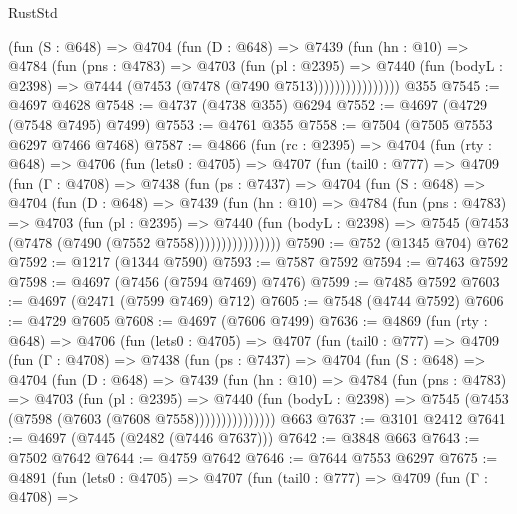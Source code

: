 \begin{lexlean}{RustStd}
\begin{coremodule}
                  (fun (S : @648) =>
                  @4704
                    (fun (D : @648) =>
                    @7439
                      (fun (hn : @10) =>
                      @4784
                        (fun (pns : @4783) =>
                        @4703
                          (fun (pl : @2395) =>
                          @7440
                            (fun (bodyL : @2398) => @7444 (@7453 (@7478 (@7490 @7513))))))))))))))))
    @355
@7545 := @4697 @4628
@7548 := @4737 (@4738 @355) @6294
@7552 := @4697 (@4729 (@7548 @7495) @7499)
@7553 := @4761 @355
@7558 := @7504 (@7505 @7553 @6297 @7466 @7468)
@7587 := @4866
    (fun (rc : @2395) =>
    @4704
      (fun (rty : @648) =>
      @4706
        (fun (lets0 : @4705) =>
        @4707
          (fun (tail0 : @777) =>
          @4709
            (fun (Γ : @4708) =>
            @7438
              (fun (ps : @7437) =>
              @4704
                (fun (S : @648) =>
                @4704
                  (fun (D : @648) =>
                  @7439
                    (fun (hn : @10) =>
                    @4784
                      (fun (pns : @4783) =>
                      @4703
                        (fun (pl : @2395) =>
                        @7440
                          (fun (bodyL : @2398) =>
                          @7545 (@7453 (@7478 (@7490 (@7552 @7558))))))))))))))))
@7590 := @752 (@1345 @704) @762
@7592 := @1217 (@1344 @7590)
@7593 := @7587 @7592
@7594 := @7463 @7592
@7598 := @4697 (@7456 (@7594 @7469) @7476)
@7599 := @7485 @7592
@7603 := @4697 (@2471 (@7599 @7469) @712)
@7605 := @7548 (@4744 @7592)
@7606 := @4729 @7605
@7608 := @4697 (@7606 @7499)
@7636 := @4869
    (fun (rty : @648) =>
    @4706
      (fun (lets0 : @4705) =>
      @4707
        (fun (tail0 : @777) =>
        @4709
          (fun (Γ : @4708) =>
          @7438
            (fun (ps : @7437) =>
            @4704
              (fun (S : @648) =>
              @4704
                (fun (D : @648) =>
                @7439
                  (fun (hn : @10) =>
                  @4784
                    (fun (pns : @4783) =>
                    @4703
                      (fun (pl : @2395) =>
                      @7440
                        (fun (bodyL : @2398) =>
                        @7545 (@7453 (@7598 (@7603 (@7608 @7558)))))))))))))))
    @663
@7637 := @3101 @2412
@7641 := @4697 (@7445 (@2482 (@7446 @7637)))
@7642 := @3848 @663
@7643 := @7502 @7642
@7644 := @4759 @7642
@7646 := @7644 @7553 @6297
@7675 := @4891
    (fun (lets0 : @4705) =>
    @4707
      (fun (tail0 : @777) =>
      @4709
        (fun (Γ : @4708) =>

\end{coremodule}
\end{lexlean}
